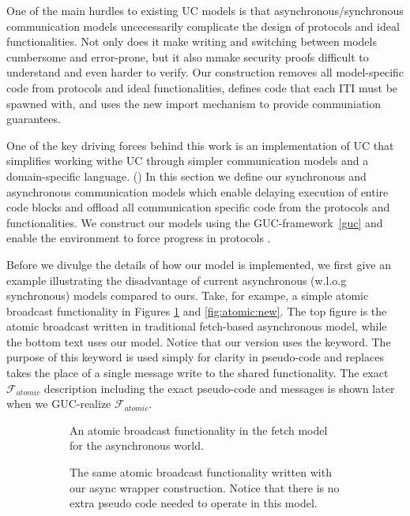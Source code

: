 
One of the main hurdles to existing UC models is that asynchronous/synchronous communication models uncecessarily complicate the design of protocols and ideal functionalities.
Not only does it make writing and switching between models cumbersome and error-prone, but it also mmake security proofs difficult to understand and even harder to verify.
Our construction removes all model-specific code from protocols and ideal functionalities, defines code that each ITI must be spawned with, and uses the new import mechanism to provide communiation guarantees.

One of the key driving forces behind this work is an implementation of UC that simplifies working withe UC through simpler communication models and a domain-specific language. ()
In this section we define our synchronous and asynchronous communication models which enable delaying execution of entire code blocks and offload all communication specific code from the protocols and functionalities. 
We construct our models using the GUC-framework~\ref{guc} and enable the environment to force progress in protocols .

Before we divulge the details of how our model is implemented, we first give an example illustrating the disadvantage of current asynchronous (w.l.o.g synchronous) models compared to ours.
Take, for exampe, a simple atomic broadcast functionality in Figures \ref{fig:atomic:old} and \ref{fig:atomic:new}. 
The top figure is the atomic broadcast written in traditional fetch-based asynchronous model, while the bottom text uses our model.
Notice that our version uses the \Eventually keyword. 
The purpose of this keyword is used simply for clarity in pseudo-code and replaces takes the place of a single message write to the shared functionality.
The exact $\mathcal{F}_{atomic}$ description including the exact pseudo-code and messages is shown later when we GUC-realize $\mathcal{F}_{atomic}$.

\begin{figure}[h]
\begin{subfigure}{\columnwidth}
	
	\caption{An atomic broadcast functionality in the fetch model for the asynchronous world.}
	\label{fig:atomic:old}
\end{subfigure}
\begin{subfigure}{\columnwidth}
	
	\caption{The same atomic broadcast functionality written with our async wrapper construction. Notice that there is no extra pseudo code needed to operate in this model.}
\end{subfigure}
\begin{subfigure}{\columnwidth}
	
	\label{fig:atomic:real}
\end{subfigure}
\end{figure}

